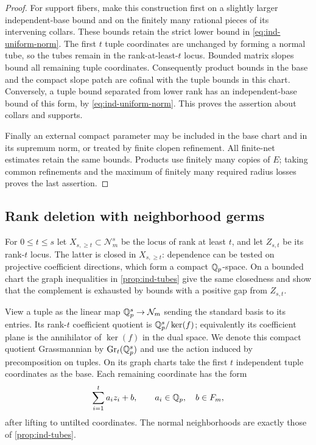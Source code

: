 \begin{proof}
For support fibers, make this construction first on a slightly
larger independent-base bound and on the finitely many rational
pieces of its intervening collars.  These bounds retain the
strict lower bound in \cref{eq:ind-uniform-norm}.  The first $t$
tuple coordinates are unchanged by forming a normal tube, so the
tubes remain in the rank-at-least-$t$ locus.  Bounded matrix slopes
bound all remaining tuple coordinates.  Consequently product
bounds in the base and the compact slope patch are cofinal with
the tuple bounds in this chart.  Conversely, a tuple bound
separated from lower rank has an independent-base bound of this
form, by \cref{eq:ind-uniform-norm}.  This proves the assertion
about collars and supports.

Finally an external compact parameter may be included in the
base chart and in its supremum norm, or treated by finite clopen
refinement.  All finite-net estimates retain the same bounds.
Products use finitely many copies of $E$; taking common refinements
and the maximum of finitely many required radius losses proves
the last assertion.
\end{proof}

\subsection{Rank deletion with neighborhood germs}

For $0\leq t\leq s$ let $X_{s,\geq t}\subset\mathcal N_m^s$ be
the locus of rank at least $t$, and let $Z_{s,t}$ be its rank-$t$
locus.  The latter is closed in $X_{s,\geq t}$: dependence can be
tested on projective coefficient directions, which form a compact
$\mathbb Q_p$-space.  On a bounded chart the graph inequalities in
\cref{prop:ind-tubes} give the same closedness and show that the
complement is exhausted by bounds with a positive gap from
$Z_{s,t}$.

View a tuple as the linear map $\mathbb Q_p^s\to\mathcal N_m$ sending
the standard basis to its entries.  Its rank-$t$ coefficient
quotient is $\mathbb Q_p^s/\ker(f)$; equivalently its coefficient plane
is the annihilator of $\ker(f)$ in the dual space.  We denote
this compact quotient Grassmannian by
$\operatorname{Gr}_t(\mathbb Q_p^s)$ and use the action induced by
precomposition on tuples.  On its graph charts take the first $t$
independent tuple coordinates as the base.  Each remaining
coordinate has the form
\begin{equation}
 \label{eq:ind-graph-centers}
  \sum_{i=1}^t a_i z_i+b,
       \qquad a_i\in\mathbb Q_p,\quad b\in F_m,
\end{equation}
after lifting to untilted coordinates.  The normal neighborhoods
are exactly those of \cref{prop:ind-tubes}.

